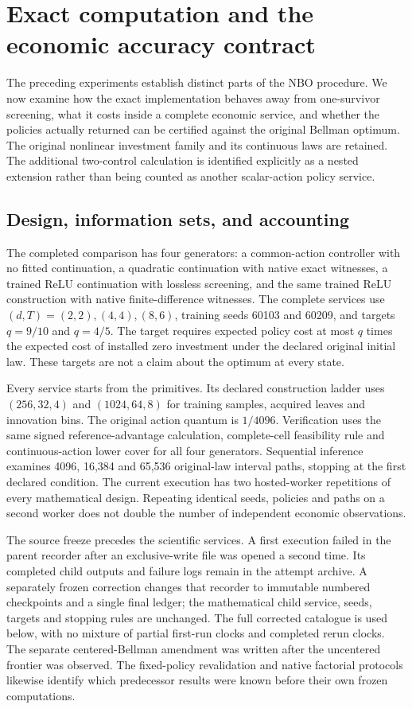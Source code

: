 \section{Exact computation and the economic accuracy contract}\label{sec:study61}
The preceding experiments establish distinct parts of the NBO procedure. We now examine how the exact implementation behaves away from one-survivor screening, what it costs inside a complete economic service, and whether the policies actually returned can be certified against the original Bellman optimum. The original nonlinear investment family and its continuous laws are retained. The additional two-control calculation is identified explicitly as a nested extension rather than being counted as another scalar-action policy service.

\subsection{Design, information sets, and accounting}
The completed comparison has four generators: a common-action controller with no fitted continuation, a quadratic continuation with native exact witnesses, a trained ReLU continuation with lossless screening, and the same trained ReLU construction with native finite-difference witnesses. The complete services use $(d,T)=(2,2),(4,4),(8,6)$, training seeds 60103 and 60209, and targets $q=9/10$ and $q=4/5$. The target requires expected policy cost at most $q$ times the expected cost of installed zero investment under the declared original initial law. These targets are not a claim about the optimum at every state.

Every service starts from the primitives. Its declared construction ladder uses $(256,32,4)$ and $(1024,64,8)$ for training samples, acquired leaves and innovation bins. The original action quantum is $1/4096$. Verification uses the same signed reference-advantage calculation, complete-cell feasibility rule and continuous-action lower cover for all four generators. Sequential inference examines 4096, 16,384 and 65,536 original-law interval paths, stopping at the first declared condition. The current execution has two hosted-worker repetitions of every mathematical design. Repeating identical seeds, policies and paths on a second worker does not double the number of independent economic observations.

The source freeze precedes the scientific services. A first execution failed in the parent recorder after an exclusive-write file was opened a second time. Its completed child outputs and failure logs remain in the attempt archive. A separately frozen correction changes that recorder to immutable numbered checkpoints and a single final ledger; the mathematical child service, seeds, targets and stopping rules are unchanged. The full corrected catalogue is used below, with no mixture of partial first-run clocks and completed rerun clocks. The separate centered-Bellman amendment was written after the uncentered frontier was observed. The fixed-policy revalidation and native factorial protocols likewise identify which predecessor results were known before their own frozen computations.

